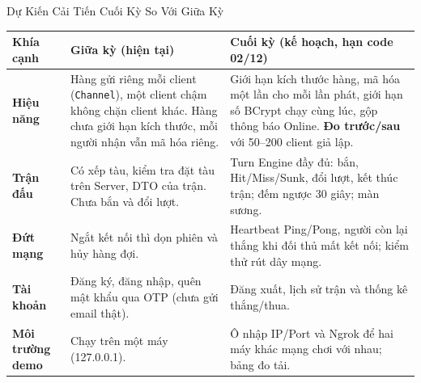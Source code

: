\begin{frame}[label=caitien]{Dự Kiến Cải Tiến Cuối Kỳ So Với Giữa Kỳ}
  \footnotesize
  \begin{tabularx}{\textwidth}{@{}l Y Y@{}}
    \toprule
    \textbf{Khía cạnh} & \textbf{Giữa kỳ (hiện tại)} & \textbf{Cuối kỳ (kế hoạch, hạn code 02/12)} \\
    \midrule
    \textbf{Hiệu năng} &
      Hàng gửi riêng mỗi client (\texttt{Channel}), một client chậm không chặn client khác. Hàng chưa giới hạn kích thước, mỗi người nhận vẫn mã hóa riêng. &
      Giới hạn kích thước hàng, mã hóa một lần cho mỗi lần phát, giới hạn số BCrypt chạy cùng lúc, gộp thông báo Online. \textbf{Đo trước/sau} với 50--200 client giả lập. \\
    \textbf{Trận đấu} &
      Có xếp tàu, kiểm tra đặt tàu trên Server, DTO của trận. Chưa bắn và đổi lượt. &
      Turn Engine đầy đủ: bắn, Hit/Miss/Sunk, đổi lượt, kết thúc trận; đếm ngược 30 giây; màn sương. \\
    \textbf{Đứt mạng} &
      Ngắt kết nối thì dọn phiên và hủy hàng đợi. &
      Heartbeat Ping/Pong, người còn lại thắng khi đối thủ mất kết nối; kiểm thử rút dây mạng. \\
    \textbf{Tài khoản} &
      Đăng ký, đăng nhập, quên mật khẩu qua OTP (chưa gửi email thật). &
      Đăng xuất, lịch sử trận và thống kê thắng/thua. \\
    \textbf{Môi trường demo} &
      Chạy trên một máy (127.0.0.1). &
      Ô nhập IP/Port và Ngrok để hai máy khác mạng chơi với nhau; bảng đo tải. \\
    \bottomrule
  \end{tabularx}
\end{frame}
